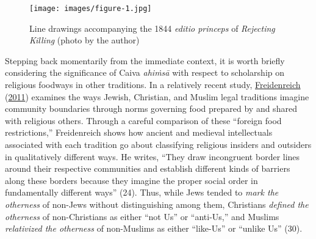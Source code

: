 \begin{figure}[ht!]\label{fig1}\centering

\texttt{[image: images/figure-1.jpg]}
\caption{Line drawings accompanying the 1844 \emph{editio princeps} of \emph{Rejecting Killing} (photo by the author)}

\end{figure}


Stepping back momentarily from the immediate context, it is worth briefly considering the significance of Caiva \emph{ahiṁsā} with respect to scholarship on religious foodways in other traditions. In a relatively recent study, \hyperref[Freidenreich2011]{Freidenreich} (\hyperref[Freidenreich2011]{2011}) examines the ways Jewish, Christian, and Muslim legal traditions imagine community boundaries through norms governing food prepared by and shared with religious others. Through a careful comparison of these “foreign food restrictions,” Freidenreich shows how ancient and medieval intellectuals associated with each tradition go about classifying religious insiders and outsiders in qualitatively different ways. He writes, “They draw incongruent border lines around their respective communities and establish different kinds of barriers along these borders because they imagine the proper social order in fundamentally different ways” (24). Thus, while Jews tended to \emph{mark the otherness} of non-Jews without distinguishing among them, Christians \emph{defined the otherness} of non-Christians as either “not Us” or “anti-Us,” and Muslims \emph{relativized the otherness} of non-Muslims as either “like-Us” or “unlike Us” (30).


